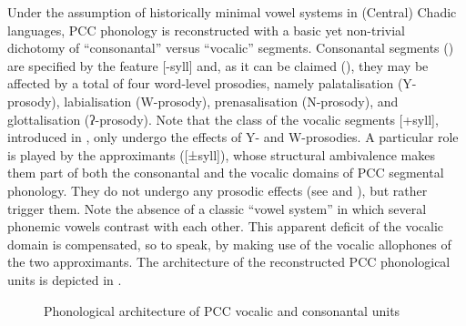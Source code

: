 \documentclass[output=paper]{langscibook}
\begin{document}
Under the assumption of historically minimal vowel systems in (Central) Chadic languages, PCC phonology is reconstructed with a basic yet non-trivial dichotomy of ``consonantal'' versus ``vocalic'' segments. Consonantal segments () are specified by the feature [-syll] and, as it can be claimed (\citealt{Wolff2022a, Wolffinpressb}), they may be affected by a total of four word-level prosodies, namely palatalisation (Y-prosody), labialisation (W-prosody), prenasalisation (N-prosody), and glottalisation (ʔ-prosody). Note that the class of the vocalic segments [+syll], introduced in , only undergo the effects of Y- and W-prosodies. A particular role is played by the approximants ([±syll]), whose structural ambivalence makes them part of both the consonantal and the vocalic domains of PCC segmental phonology. They do not undergo any prosodic effects (see  and ), but rather trigger them. Note the absence of a classic “vowel system” in which several phonemic vowels contrast with each other. This apparent deficit of the vocalic domain is compensated, so to speak, by making use of the vocalic allophones of the two approximants. The architecture of the reconstructed PCC phonological units is depicted in .

\begin{figure}
\caption{\label{fig:wolff:3}Phonological architecture of PCC vocalic and consonantal units}
\end{figure}
\end{document}
